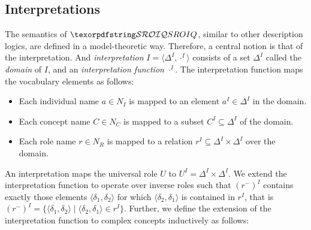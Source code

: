 \subsection{Interpretations} \label{interpretations}

The semantics of $\SROIQ$, similar to other description logics, are defined in a model-theoretic way. Therefore, a central notion is that of the interpretation. And \emph{interpretation} $I = \langle \Delta^I, \cdot^I \rangle$ consists of a set $\Delta^I$ called the \emph{domain} of $I$, and an \emph{interpretation function} $\cdot^I$. The interpretation function maps the vocabulary elements as follows:
\begin{itemize}
  \item Each individual name $a \in N_I$ is mapped to an element $a^I \in \Delta^I$ in the domain.
  \item Each concept name $C \in N_C$ is mapped to a subset $C^I \subseteq \Delta^I$ of the domain.
  \item Each role name $r \in N_R$ is mapped to a relation $r^I \subseteq \Delta^I \times \Delta^I$ over the domain.
\end{itemize}
An interpretation maps the universal role $U$ to $U^I = \Delta^I \times \Delta^I$. We extend the interpretation function to operate over inverse roles such that  $\left(r^-\right)^I$ contains exactly those elements $\langle \delta_1, \delta_2 \rangle$ for which $\langle \delta_2, \delta_1 \rangle$ is contained in $r^I$, that is  $\left(r^-\right)^I = \{ \langle \delta_1, \delta_2 \rangle \mid \langle \delta_2, \delta_1 \rangle \in r^I \}$. Further, we define the extension of the interpretation function to complex concepts inductively as follows:
